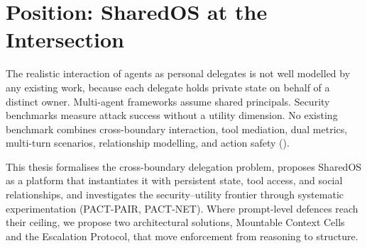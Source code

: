 \section{Position: SharedOS at the Intersection}
\label{sec:rw_position}

The realistic interaction of agents as personal delegates is not well modelled by any existing work, because each delegate holds private state on behalf of a distinct owner. Multi-agent frameworks assume shared principals. Security benchmarks measure attack success without a utility dimension. No existing benchmark combines cross-boundary interaction, tool mediation, dual metrics, multi-turn scenarios, relationship modelling, and action safety ().

This thesis formalises the cross-boundary delegation problem, proposes SharedOS as a platform that instantiates it with persistent state, tool access, and social relationships, and investigates the security--utility frontier through systematic experimentation (PACT-PAIR, PACT-NET). Where prompt-level defences reach their ceiling, we propose two architectural solutions, Mountable Context Cells and the Escalation Protocol, that move enforcement from reasoning to structure.
